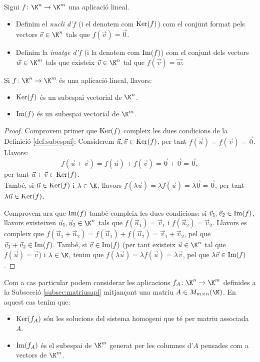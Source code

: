 \begin{definicio}\label{def:nucliimatge}
	Sigui $f\colon \K^n \to \K^m$ una aplicació lineal.
	\begin{itemize}
		\item Definim el \emph{nucli d'$f$} (i el denotem com $\operatorname{Ker}(f)$) com el conjunt format pels vectors $\vec v\in \K^n$ tals que $f(\vec v)=\vec 0$.
		\item Definim la \emph{imatge d'$f$} (i la denotem com $\operatorname{Im}(f)$) com el conjunt dels vectors $\vec w\in\K^m$ tals que existeix $\vec v\in \K^n$ tal que $f(\vec v)=\vec w$.
	\end{itemize}
\end{definicio}
\begin{proposicio}
	Si $f \colon \K^n \to \K^m$ és una aplicació lineal, llavors:
	\begin{itemize}
		\item $\operatorname{Ker}(f)$ és un subespai vectorial de $\K^n$.
		\item $\operatorname{Im}(f)$ és un subespai vectorial de $\K^m$.
	\end{itemize}
\end{proposicio}
\begin{proof}
	Comprovem primer que $\operatorname{Ker}(f)$ compleix les dues condicions de la Definició \ref{def:subespai}:
	Considerem $\vec u, \vec v \in \operatorname{Ker}(f)$, per tant $f(\vec u)=f(\vec v)=\vec 0$. Llavors:
	$$
	f(\vec u+\vec v)=f(\vec u)+f(\vec v)=\vec 0+\vec 0 =\vec 0 ,
	$$
	per tant $\vec u+\vec v \in \operatorname{Ker}(f)$.\\
	També, si $\vec u \in \operatorname{Ker}(f)$ i $\lambda\in\K$, llavors $f(\lambda \vec u)=\lambda f(\vec u)=\lambda \vec 0=\vec 0$, per tant $\lambda \vec u\in\operatorname{Ker}(f)$.
	
	Comprovem ara que $\operatorname{Im}(f)$ també compleix les dues condicions: si $\vec v_1,\vec v_2 \in\operatorname{Im}(f)$, llavors existeixen $\vec u_1, \vec u_2 \in \K^n$ tals que $f(\vec u_1)=\vec v_1$ i $f(\vec u_2)=\vec v_2$. Llavors es compleix que $f(\vec u_1+\vec u_2)=f(\vec u_1)+f(\vec u_2)=\vec v_1+\vec v_2$, pel que $\vec v_1+\vec v_2 \in \operatorname{Im}(f)$. També, si $\vec v\in \operatorname{Im}(f)$ (per tant existeix $\vec u\in \K^n$ tal que $f(\vec u)=\vec v$) i $\lambda\in\K$, tenim que $f(\lambda \vec u)=\lambda f(\vec u)=\lambda \vec v$, pel que $\lambda \vec v \in \operatorname{Im}(f)$.
\end{proof}
Com a cas particular podem considerar les aplicacions $f_A\colon \K^n\to\K^m$ definides a la Subsecció \ref{subsec:matriusapl} mitjançant una matriu $A\in M_{m\times n}(\K)$. En aquest cas tenim que: 
\begin{itemize}
    \item $\operatorname{Ker}(f_A)$ són les solucions del sistema homogeni que té per matriu associada $A$.
    \item $\operatorname{Im}(f_A)$ és el subespai de $\K^m$ generat per les columnes d'$A$ pensades com a vectors de $\K^m$.
\end{itemize}

